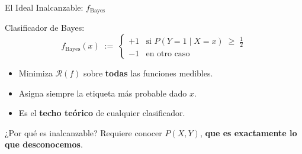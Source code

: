 \documentclass[aspectratio=169, 10pt]{beamer}
\begin{document}



\begin{frame}{El Ideal Inalcanzable: $f_{\mathrm{Bayes}}$}

      \begin{block}{Clasificador de Bayes:}
        \large
      \[
        f_{\mathrm{Bayes}}(x) \;:=\;
        \begin{cases}
          +1 & \text{si } P(Y=1\mid X=x)\;\geq\;\tfrac{1}{2}\\[4pt]
          -1 & \text{en otro caso}
        \end{cases}
      \]
      \end{block}
\pause
      \vspace{0.5em}
      \begin{itemize}
        \setlength{\itemsep}{0.5em}
        \item Minimiza $\mathcal{R}(f)$ sobre \textbf{todas} las funciones medibles.
        \pause
        \item Asigna siempre la etiqueta más probable dado $x$.
        \pause
        \item Es el \textbf{techo teórico} de cualquier clasificador.
      \end{itemize}
    \pause
      \begin{alertblock}{¿Por qué es inalcanzable?}
        \large
        Requiere conocer $P(X, Y)$,\textbf{ que es exactamente lo que desconocemos}.
      \end{alertblock}
\end{frame}
\end{document}
